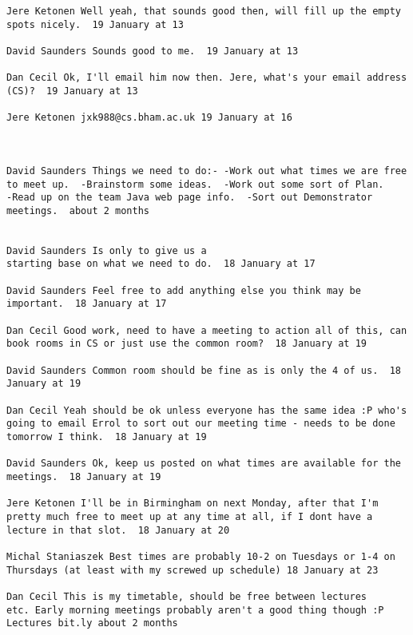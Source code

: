 \documentclass[10pt]{report}
\begin{document}
\begin{verbatim}
Jere Ketonen Well yeah, that sounds good then, will fill up the empty
spots nicely.  19 January at 13

David Saunders Sounds good to me.  19 January at 13

Dan Cecil Ok, I'll email him now then. Jere, what's your email address
(CS)?  19 January at 13

Jere Ketonen jxk988@cs.bham.ac.uk 19 January at 16



David Saunders Things we need to do:- -Work out what times we are free
to meet up.  -Brainstorm some ideas.  -Work out some sort of Plan.
-Read up on the team Java web page info.  -Sort out Demonstrator
meetings.  about 2 months 
 

David Saunders Is only to give us a
starting base on what we need to do.  18 January at 17

David Saunders Feel free to add anything else you think may be
important.  18 January at 17

Dan Cecil Good work, need to have a meeting to action all of this, can
book rooms in CS or just use the common room?  18 January at 19

David Saunders Common room should be fine as is only the 4 of us.  18
January at 19

Dan Cecil Yeah should be ok unless everyone has the same idea :P who's
going to email Errol to sort out our meeting time - needs to be done
tomorrow I think.  18 January at 19

David Saunders Ok, keep us posted on what times are available for the
meetings.  18 January at 19

Jere Ketonen I'll be in Birmingham on next Monday, after that I'm
pretty much free to meet up at any time at all, if I dont have a
lecture in that slot.  18 January at 20

Michal Staniaszek Best times are probably 10-2 on Tuesdays or 1-4 on
Thursdays (at least with my screwed up schedule) 18 January at 23

Dan Cecil This is my timetable, should be free between lectures
etc. Early morning meetings probably aren't a good thing though :P
Lectures bit.ly about 2 months 

\end{verbatim}
\end{document}
